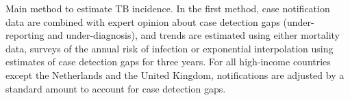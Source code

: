 \label{fig:incmethods}Main method to estimate TB incidence. In the first method, case notification data are combined with expert opinion about case detection gaps (under-reporting and under-diagnosis), and trends are estimated using either mortality data, surveys of the annual risk of infection or exponential interpolation using estimates of case detection gaps for three years. For all high-income countries except the Netherlands and the United Kingdom, notifications are adjusted by a standard amount to account for case detection gaps. 